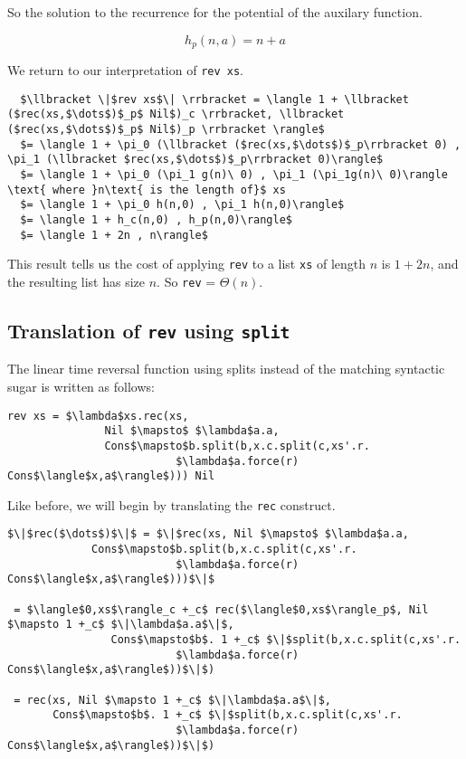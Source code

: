 \documentclass[12pt,letterpaper]{article}
\begin{document}
So the solution to the recurrence for the potential of the auxilary function.
\begin{framed}
  \[h_p(n,a) = n + a \]
\end{framed}


We return to our interpretation of \texttt{rev xs}.
\begin{lstlisting}
  $\llbracket \|$rev xs$\| \rrbracket = \langle 1 + \llbracket ($rec(xs,$\dots$)$_p$ Nil$)_c \rrbracket, \llbracket ($rec(xs,$\dots$)$_p$ Nil$)_p \rrbracket \rangle$
  $= \langle 1 + \pi_0 (\llbracket ($rec(xs,$\dots$)$_p\rrbracket 0) , \pi_1 (\llbracket $rec(xs,$\dots$)$_p\rrbracket 0)\rangle$
  $= \langle 1 + \pi_0 (\pi_1 g(n)\ 0) , \pi_1 (\pi_1g(n)\ 0)\rangle \text{ where }n\text{ is the length of}$ xs
  $= \langle 1 + \pi_0 h(n,0) , \pi_1 h(n,0)\rangle$
  $= \langle 1 + h_c(n,0) , h_p(n,0)\rangle$
  $= \langle 1 + 2n , n\rangle$
\end{lstlisting}

This result tells us the cost of applying \texttt{rev} to a list \texttt{xs} of length $n$ is $1+2n$, and the resulting list has size $n$.
So \texttt{rev} = $\Theta(n)$.




\subsection*{Translation of \texttt{rev} using \texttt{split}}
The linear time reversal function using splits instead of the matching syntactic sugar is written as follows:
\begin{small}
\begin{lstlisting}
rev xs = $\lambda$xs.rec(xs,
               Nil $\mapsto$ $\lambda$a.a,
               Cons$\mapsto$b.split(b,x.c.split(c,xs'.r.
                          $\lambda$a.force(r) Cons$\langle$x,a$\rangle$))) Nil
\end{lstlisting}
\end{small}

Like before, we will begin by translating the \texttt{rec} construct.
\begin{lstlisting}
$\|$rec($\dots$)$\|$ = $\|$rec(xs, Nil $\mapsto$ $\lambda$a.a,
             Cons$\mapsto$b.split(b,x.c.split(c,xs'.r.
                          $\lambda$a.force(r) Cons$\langle$x,a$\rangle$)))$\|$

 = $\langle$0,xs$\rangle_c +_c$ rec($\langle$0,xs$\rangle_p$, Nil $\mapsto 1 +_c$ $\|\lambda$a.a$\|$,
                Cons$\mapsto$b$. 1 +_c$ $\|$split(b,x.c.split(c,xs'.r.
                          $\lambda$a.force(r) Cons$\langle$x,a$\rangle$))$\|$)

 = rec(xs, Nil $\mapsto 1 +_c$ $\|\lambda$a.a$\|$,
       Cons$\mapsto$b$. 1 +_c$ $\|$split(b,x.c.split(c,xs'.r.
                          $\lambda$a.force(r) Cons$\langle$x,a$\rangle$))$\|$)
\end{lstlisting}
\end{document}
